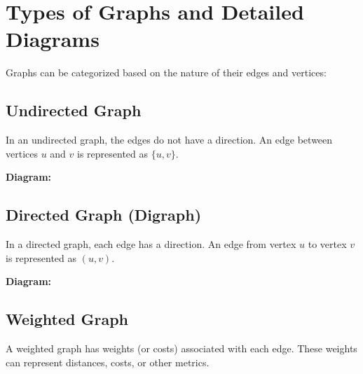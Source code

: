 \section{Types of Graphs and Detailed Diagrams}
Graphs can be categorized based on the nature of their edges and vertices:

\subsection{Undirected Graph}
In an undirected graph, the edges do not have a direction. An edge between vertices \( u \) and \( v \) is represented as \( \{u, v\} \).

\textbf{Diagram:}
\begin{center}
\end{center}

\subsection{Directed Graph (Digraph)}
In a directed graph, each edge has a direction. An edge from vertex \( u \) to vertex \( v \) is represented as \( (u, v) \).

\textbf{Diagram:}
\begin{center}
\end{center}

\subsection{Weighted Graph}
A weighted graph has weights (or costs) associated with each edge. These weights can represent distances, costs, or other metrics.

